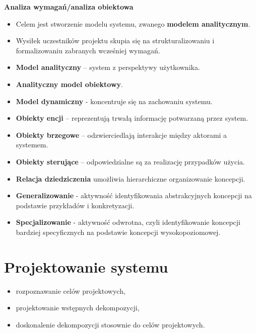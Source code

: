 \documentclass[a4paper]{article}
\begin{document}
    \textbf{Analiza wymagań/analiza obiektowa}
    \begin{itemize}
        \item Celem jest stworzenie modelu systemu, zwanego \textbf{modelem analitycznym}.
        \item Wysiłek uczestników projektu skupia się na strukturalizowaniu i formalizowaniu zabranych
        wcześniej wymagań.

        \item \textbf{Model analityczny} – system z perspektywy użytkownika.
        \item \textbf{Analityczny model obiektowy}.
        \item \textbf{Model dynamiczny} - koncentruje się na zachowaniu systemu.
        \item \textbf{Obiekty encji} – reprezentują trwałą informację potwarzaną przez system.
        \item \textbf{Obiekty brzegowe} – odzwierciedlają interakcje między aktorami a systemem.
        \item \textbf{Obiekty sterujące} – odpowiedzialne są za realizację przypadków użycia.
        \item \textbf{Relacja dziedziczenia} umożliwia hierarchiczne organizowanie koncepcji.
        \item \textbf{Generalizowanie} - aktywność identyfikowania abstrakcyjnych koncepcji na podstawie przykładów i konkretyzacji.
        \item \textbf{Specjalizowanie} - aktywność odwrotna, czyli identyfikowanie koncepcji bardziej specyficznych na podstawie koncepcji wysokopoziomowej.
    \end{itemize}


    \section{Projektowanie systemu}
    \begin{itemize}
        \item rozpoznawanie celów projektowych,
        \item projektowanie wstępnych dekompozycji,
        \item doskonalenie dekompozycji stosownie do celów projektowych.
    \end{itemize}
\end{document}
